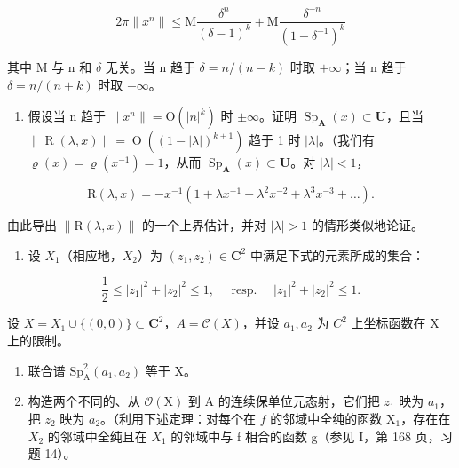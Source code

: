 \[
2 \pi \| x ^ {n} \| \leqslant \mathrm{M} \frac {\delta^ {n}}{(\delta - 1) ^ {k}} + \mathrm{M} \frac {\delta^ {- n}}{(1 - \delta^ {- 1}) ^ {k}}
\]

其中 M 与 n 和 \(\delta\) 无关。当 n 趋于 \(\delta = n/(n - k)\) 时取 \(+\infty\)；当 n 趋于 \(\delta = n/(n + k)\) 时取 \(-\infty\)。

\begin{enumerate}
\def\labelenumi{\alph{enumi})}
\setcounter{enumi}{1}
\tightlist
\item
  假设当 n 趋于 \(\|x^{n}\|=\mathrm{O}(|n|^{k})\) 时 \(\pm\infty\)。证明 \(\operatorname{Sp}_{\mathbf{A}}(x)\subset\mathbf{U}\)，且当 \(\|\operatorname{R}(\lambda,x)\|=\operatorname{O}((1-|\lambda|)^{k+1})\) 趋于 1 时 \(|\lambda|\)。（我们有 \(\varrho(x)=\varrho(x^{-1})=1\)，从而 \(\operatorname{Sp}_{\mathbf{A}}(x)\subset\mathbf{U}\)。对 \(|\lambda|<1\)，
\end{enumerate}

\[
\mathrm{R} (\lambda , x) = - x ^ {- 1} \left(1 + \lambda x ^ {- 1} + \lambda^ {2} x ^ {- 2} + \lambda^ {3} x ^ {- 3} + \dots\right).
\]

由此导出 \(\|\mathrm{R}(\lambda,x)\|\) 的一个上界估计，并对 \(|\lambda|>1\) 的情形类似地论证。

\begin{enumerate}
\def\labelenumi{\arabic{enumi})}
\setcounter{enumi}{16}
\tightlist
\item
  设 \(X_{1}\)（相应地，\(X_{2}\)）为 \((z_{1}, z_{2}) \in \mathbf{C}^{2}\) 中满足下式的元素所成的集合：
\end{enumerate}

\[
\frac {1}{2} \leqslant | z _ {1} | ^ {2} + | z _ {2} | ^ {2} \leqslant 1, \quad \text { resp. } \quad | z _ {1} | ^ {2} + | z _ {2} | ^ {2} \leqslant 1.
\]

  设 \(X = X_{1} \cup \{(0,0)\} \subset \mathbf{C}^{2}\)，\(A = \mathcal{C}(X)\)，并设 \(a_{1}, a_{2}\) 为 \(C^{2}\) 上坐标函数在 X 上的限制。

\begin{enumerate}
\def\labelenumi{\alph{enumi})}
\item
  联合谱 \(\mathrm{Sp}_{\mathrm{A}}^{2}(a_{1},a_{2})\) 等于 X。
\item
  构造两个不同的、从 \(\mathcal{O}(\mathrm{X})\) 到 A 的连续保单位元态射，它们把 \(z_{1}\) 映为 \(a_{1}\)，把 \(z_{2}\) 映为 \(a_{2}\)。（利用下述定理：对每个在 \(f\) 的邻域中全纯的函数 \(\mathrm{X}_{1}\)，存在在 \(X_{2}\) 的邻域中全纯且在 \(X_{1}\) 的邻域中与 f 相合的函数 g（参见 I，第 168 页，习题 14）。
\end{enumerate}

